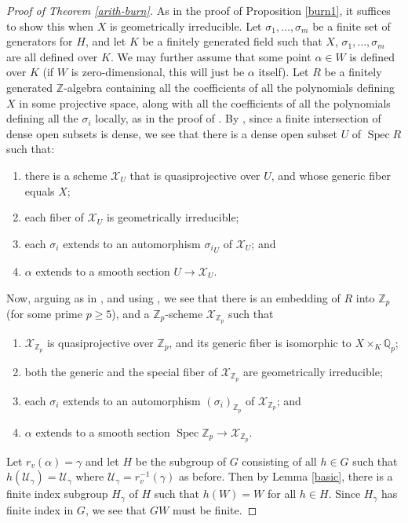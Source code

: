 \documentclass{amsart}
\newcommand{\lra}{\longrightarrow}
\newcommand{\bZ} {\mathbb{Z}}
\newcommand{\bQ}{\mathbb{Q}}
\newcommand{\cU}{\mathcal{U}}
\DeclareMathOperator{\Spec}{Spec}
\newcommand{\cX}{\mathcal X}
\theoremstyle{definition}
\begin{document}
\begin{proof}[Proof of Theorem \ref{arith-burn}]
  As in the proof of Proposition \ref{burn1}, it suffices to show this
  when $X$ is geometrically irreducible.  Let
  $\sigma_1,\dots, \sigma_m$ be a finite set of generators for $H$,
  and let $K$ be a finitely generated field such that $X$,
  $\sigma_1,\dots, \sigma_m$ are all defined over $K$.  We may further
  assume that some point $\alpha \in W$ is defined over $K$ (if $W$ is
  zero-dimensional, this will just be $\alpha$ itself).  Let $R$ be a
  finitely generated $\bZ$-algebra containing all the coefficients of
  all the polynomials defining $X$ in some projective space, along
  with all the coefficients of all the polynomials defining all the
  $\sigma_i$ locally, as in the proof of \cite[Theorem 4.1]{BGT1}.  By
  \cite[Proposition 4.3]{BGT1}, since a finite intersection of dense
  open subsets is dense, we see that there is a dense open subset $U$
  of $\Spec R$ such that:
\begin{enumerate}
\item there is a scheme $\cX_{U}$ that is quasiprojective over $U$, and whose generic fiber equals $X$;
\item each fiber of $\cX_{U}$ is geometrically irreducible;
\item each $\sigma_i$ extends to an automorphism ${\sigma_i}_{U}$ of $\cX_{U}$; and
\item $\alpha$ extends to a smooth section $U \lra \cX_U$.
\end{enumerate}
Now, arguing as in \cite[Proposition 4.4]{BGT1}, and using \cite[Lemma
3.1]{Bell}, we see that there is an embedding of $R$ into $\bZ_p$ (for
some prime $p\ge 5$), and a
$\bZ_p$-scheme $\cX_{\bZ_p}$ such that
\begin{enumerate}
\item $\cX_{\bZ_p}$ is quasiprojective over $\bZ_p$, and its
  generic fiber is isomorphic to $X \times_K \bQ_p$;
\item both the generic and the special fiber of $\cX_{\bZ_p}$ are geometrically irreducible;
\item each $\sigma_i$ extends to an automorphism $(\sigma_i)_{\bZ_p}$ of $\cX_{\bZ_p}$; and
\item $\alpha$ extends to a smooth section $ \Spec \bZ_p \lra \cX_{\bZ_p}$.
\end{enumerate}

Let $r_v(\alpha) = \gamma$ and let $H$ be the subgroup of $G$
consisting of all $h \in G$ such that $h(\cU_\gamma) = \cU_\gamma$
where $\cU_\gamma = r_v^{-1}(\gamma)$ as before.  Then by Lemma
\ref{basic}, there is a finite index subgroup $H_\gamma$ of $H$ such
that $h(W) = W$ for all $h \in H$.  Since $H_\gamma$ has finite index
in $G$, we see that $GW$ must be finite.

\end{proof}
\end{document}
